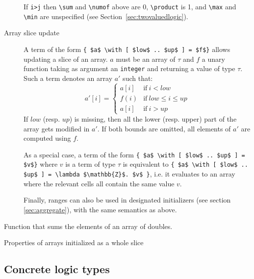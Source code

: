 \begin{description}
  If \lstinline|i>j| then \lstinline|\sum| and \lstinline|\numof| above are 0,
  \lstinline|\product| is 1, and \lstinline|\max| and \lstinline|\min| are
  unspecified (see Section~\ref{sec:twovaluedlogic}).
\item[Array slice update]
  A term of the form
  \lstinline|{ $a$ \with [ $low$ .. $up$ ] = $f$}| allows updating a slice of
  an array. $a$ must be an array of $\tau$ and $f$
  a unary function taking as argument
  an \lstinline|integer| and returning a value of type $\tau$. Such a term
  denotes an array $a'$ such that:
  \[
    a'[i] = \left\{\begin{array}{lr}
                    a[i] & \mathrm{if~} i < low \\
                    f(i) & \mathrm{if~} low \leq i \leq up \\
                    a[i] & \mathrm{if~} i > up
                    \end{array}\right.
  \]
If $low$ (resp. $up$) is missing, then all the lower (resp. upper) part of
the array gets modified in $a'$. If both bounds are omitted, all elements of
$a'$ are computed using $f$.

As a special case, a term of the form
\lstinline|{ $a$ \with [ $low$ .. $up$ ] = $v$}| where $v$ is a term of type
$\tau$ is equivalent to
\lstinline|{ $a$ \with [ $low$ .. $up$ ] = \lambda $\mathbb{Z}$. $v$ }|, i.e.
it evaluates to an array where the relevant cells all contain the same
value $v$.

Finally, ranges can also be used in designated initializers
(see section \ref{sec:aggregate}), with the same semantics as above.
\end{description}


\begin{example}
  \label{ex:higherorder}
  Function that sums the elements of an array of doubles.
\end{example}

\begin{example}
  \label{ex:arraysliceupdate}
  Properties of arrays initialized as a whole slice
\end{example}

\subsection{Concrete logic types}\label{sec:concrete-logic-types}
\label{sec:concretetypes}
\experimental

